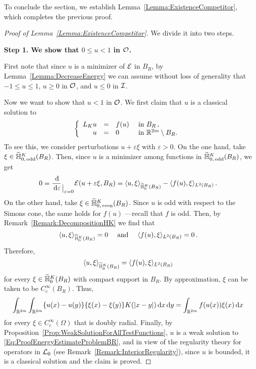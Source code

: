 To conclude the section, we establish Lemma~\ref{Lemma:ExistenceCompetitor}, which completes the previous proof.

\begin{proof}[Proof of Lemma~\ref{Lemma:ExistenceCompetitor}] We divide it into two steps.
	\medskip
		
	\textbf{Step 1. We show that $0\leq u < 1$ in $\mathcal{O}$.}
	 
	First note that since $u$ is a minimizer of $\mathcal{E}$ in $B_R$, by Lemma~\ref{Lemma:DecreaseEnergy} we can assume without loss of generality that $-1 \leq u \leq 1$, $u \geq 0$ in $\mathcal{O}$, and $u \leq 0$ in $\mathcal{I}$. 
	
	
	Now we want to show that $u < 1$ in $\mathcal{O}$. We first claim that $u$ is a classical solution to
	\begin{equation}
	\label{Eq:ProofEnergyEstimateProblemBR}
	\left\{\begin{array}{rcll}
	L_K  u &=& f(u) & \textrm{ in } B_R\,,\\
	u &=& 0 & \textrm{ in }\mathbb{R}^{2m} \setminus B_R.
	\end{array} \right.
	\end{equation}
	To see this, we consider perturbations $u +  \varepsilon \xi$ with $\varepsilon>0$. On the one hand, take $\xi \in \widetilde{\mathbb{H}}^K_{0, \,\mathrm{odd}}(B_R)$. Then, since $u$ is a minimizer among functions in $\widetilde{\mathbb{H}}^K_{0, \,\mathrm{odd}}(B_R)$, we get
	$$
	0 = \dfrac{\,\mathrm{d}}{\,\mathrm{d} \varepsilon}_{\mkern1.5mu\big\vert_{\scriptstyle \varepsilon = 0}} \mathcal{E}(u +  \varepsilon \xi, B_R) = \langle u,\xi \rangle_{\widetilde{\mathbb{H}}^K_0(B_R)} - \langle f(u),\xi \rangle_{L^2(B_R)}\,.
	$$
	On the other hand, take $\xi \in \widetilde{\mathbb{H}}^K_{0, \,\mathrm{even}}(B_R)$. Since $u$ is odd with respect to the Simons cone, the same holds for $f(u)$ ---recall that $f$ is odd. Then, by Remark~\ref{Remark:DecompositionHK} we find that
	$$
	\langle u,\xi \rangle_{\widetilde{\mathbb{H}}^K_0(B_R)} = 0 \quad \textrm{ and } \quad  \langle f(u),\xi \rangle_{L^2(B_R)} = 0\,.
	$$
	Therefore, 
	$$
	\langle u,\xi \rangle_{\widetilde{\mathbb{H}}^K_0(B_R)} = \langle f(u),\xi \rangle_{L^2(B_R)}
	$$
	for every $\xi \in\widetilde{\mathbb{H}}^K_0(B_R)$ with compact support in  $B_R$. By approximation, $\xi$ can be taken to be $C^\infty_c(B_R)$. Thus,
	$$
	\int_{\mathbb{R}^{2m}}\int_{\mathbb{R}^{2m}} \{u(x)-u(y)\}\{\xi(x)-\xi(y)\} K(|x-y|) \,\mathrm{d} x \,\mathrm{d} y = \int_{\mathbb{R}^{2m}} f(u(x)) \xi(x) \,\mathrm{d} x
	$$
	for every $\xi \in C^\infty_c(\Omega)$ that is doubly radial. Finally, by Proposition~\ref{Prop:WeakSolutionForAllTestFunctions}, $u$ is a weak solution to \eqref{Eq:ProofEnergyEstimateProblemBR}, and in view of the regularity theory for operators in $\mathcal{L}_0$ (see Remark~\ref{Remark:InteriorRegularity}), since $u$ is bounded, it is a classical solution and the claim is proved.
	

\end{proof}

